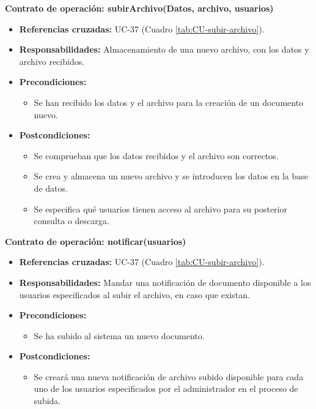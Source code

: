 \textbf{Contrato de operación: subirArchivo(Datos, archivo, usuarios)}
\begin{itemize}
\item \textbf{Referencias cruzadas:} UC-37 (Cuadro \ref{tab:CU-subir-archivo}).
\item \textbf{Responsabilidades:} Almacenamiento de una nuevo archivo, con los datos y archivo recibidos.
\item \textbf{Precondiciones:} 
 \begin{itemize}
\item Se han recibido los datos y el archivo para la creación de un documento nuevo.
\end {itemize}
\item \textbf{Postcondiciones:} 
 \begin{itemize}
 \item Se comprueban que los datos recibidos y el archivo son correctos.
\item Se crea y almacena un nuevo archivo y se introducen los datos en la base de datos.
\item Se especifica qué usuarios tienen acceso al archivo para su posterior consulta o descarga.
\end {itemize}
\end {itemize}

\textbf{Contrato de operación: notificar(usuarios)}
\begin{itemize}
\item \textbf{Referencias cruzadas:} UC-37 (Cuadro \ref{tab:CU-subir-archivo}).
\item \textbf{Responsabilidades:} Mandar una notificación de documento disponible a los usuarios especificados al subir el archivo, en caso que existan.
\item \textbf{Precondiciones:} 
 \begin{itemize}
\item Se ha subido al sistema un nuevo documento.
\end {itemize}
\item \textbf{Postcondiciones:} 
 \begin{itemize}
\item Se creará una nueva notificación de archivo subido disponible para cada uno de los usuarios especificados por el administrador en el proceso de subida.
\end {itemize}
\end {itemize}

